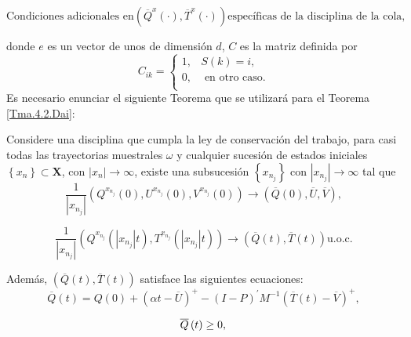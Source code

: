 \begin{equation}\label{Eq.MF.6.3}
\textrm{Condiciones adicionales en
}\left(\overline{Q}^{x}\left(\cdot\right),\overline{T}^{x}\left(\cdot\right)\right)\textrm{
espec\'ificas de la disciplina de la cola,}
\end{equation}

donde $e$ es un vector de unos de dimensi\'on $d$, $C$ es la
matriz definida por
\[C_{ik}=\left\{\begin{array}{cc}
1,& S\left(k\right)=i,\\
0,& \textrm{ en otro caso}.\\
\end{array}\right.
\]
Es necesario enunciar el siguiente Teorema que se utilizar\'a para
el Teorema \ref{Tma.4.2.Dai}:
\begin{Teo}
Considere una disciplina que cumpla la ley de conservaci\'on del
trabajo, para casi todas las trayectorias muestrales $\omega$ y
cualquier sucesi\'on de estados iniciales
$\left\{x_{n}\right\}\subset \mathbf{X}$, con
$|x_{n}|\rightarrow\infty$, existe una subsucesi\'on
$\left\{x_{n_{j}}\right\}$ con $|x_{n_{j}}|\rightarrow\infty$ tal
que
\begin{equation}\label{Eq.4.15}
\frac{1}{|x_{n_{j}}|}\left(Q^{x_{n_{j}}}\left(0\right),U^{x_{n_{j}}}\left(0\right),V^{x_{n_{j}}}\left(0\right)\right)\rightarrow\left(\overline{Q}\left(0\right),\overline{U},\overline{V}\right),
\end{equation}

\begin{equation}\label{Eq.4.16}
\frac{1}{|x_{n_{j}}|}\left(Q^{x_{n_{j}}}\left(|x_{n_{j}}|t\right),T^{x_{n_{j}}}\left(|x_{n_{j}}|t\right)\right)\rightarrow\left(\overline{Q}\left(t\right),\overline{T}\left(t\right)\right)\textrm{
u.o.c.}
\end{equation}

Adem\'as,
$\left(\overline{Q}\left(t\right),\overline{T}\left(t\right)\right)$
satisface las siguientes ecuaciones:
\begin{equation}\label{Eq.MF.1.3a}
\overline{Q}\left(t\right)=Q\left(0\right)+\left(\alpha
t-\overline{U}\right)^{+}-\left(I-P\right)^{'}M^{-1}\left(\overline{T}\left(t\right)-\overline{V}\right)^{+},
\end{equation}

\begin{equation}\label{Eq.MF.2.3a}
\overline{Q}\left(t\right)\geq0,\\
\end{equation}


\end{Teo}
